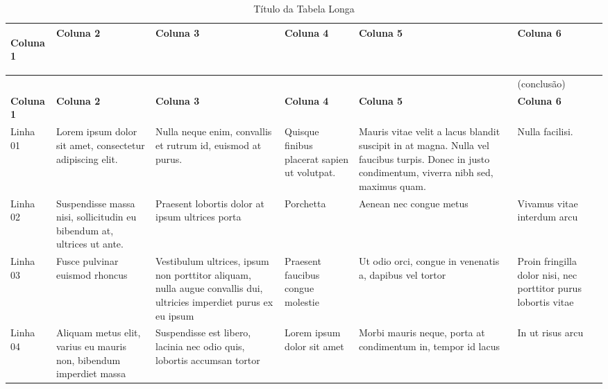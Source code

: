 {\footnotesize
	\centering
	\begin{longtable}{ M{.10\textwidth}  M{.15\textwidth}  M{.16\textwidth}  M{.15\textwidth}  M{.16\textwidth}  M{.12\textwidth} }
		
		\caption{Título da Tabela Longa} \\ \toprule
		\label{tabela:longa}
		
		\textbf{Coluna 1} & \textbf{Coluna 2} & \textbf{Coluna 3} & \textbf{Coluna 4} & \textbf{Coluna 5} & \textbf{Coluna 6} \\ %
		
		\hline 
		
		\endfirsthead
		& & & & & \null \hfill(conclusão)\\ 
		
		\toprule
		
		\textbf{Coluna 1} & \textbf{Coluna 2} & \textbf{Coluna 3} & \textbf{Coluna 4} & \textbf{Coluna 5} & \textbf{Coluna 6} \\ %
		
		\hline %
		
		\endhead
		
		Linha 01 & Lorem ipsum dolor sit amet, consectetur adipiscing elit. & Nulla neque enim, convallis et rutrum id, euismod at purus. &  Quisque finibus placerat sapien ut volutpat.  & Mauris vitae velit a lacus blandit suscipit in at magna. Nulla vel faucibus turpis. Donec in justo condimentum, viverra nibh sed, maximus quam. & Nulla facilisi. \\
		
		Linha 02 & Suspendisse massa nisi, sollicitudin eu bibendum at, ultrices ut ante. & Praesent lobortis dolor at ipsum ultrices porta &  Porchetta & Aenean nec congue metus & Vivamus vitae interdum arcu \\
		
		Linha 03 & Fusce pulvinar euismod rhoncus & Vestibulum ultrices, ipsum non porttitor aliquam, nulla augue convallis dui, ultricies imperdiet purus ex eu ipsum &  Praesent faucibus congue molestie & Ut odio orci, congue in venenatis a, dapibus vel tortor & Proin fringilla dolor nisi, nec porttitor purus lobortis vitae \\
		
		Linha 04 & Aliquam metus elit, varius eu mauris non, bibendum imperdiet massa & Suspendisse est libero, lacinia nec odio quis, lobortis accumsan tortor &  Lorem ipsum dolor sit amet & Morbi mauris neque, porta at condimentum in, tempor id lacus & In ut risus arcu \\
		

\end{longtable}}
